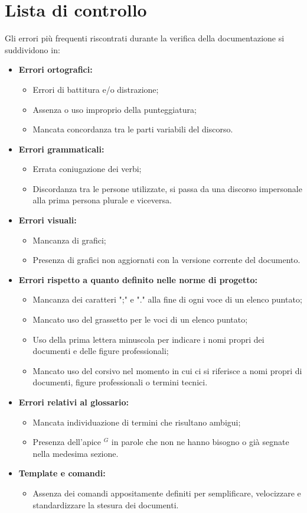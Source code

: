\clearpage
\section{Lista di controllo}
\label{lista_controllo}
Gli errori più frequenti riscontrati durante la verifica della documentazione si suddividono in:
\begin{itemize}
	\item \textbf{Errori ortografici:}
	\begin{itemize}
		\item Errori di battitura e/o distrazione;
		\item Assenza o uso improprio della punteggiatura;
		\item Mancata concordanza tra le parti variabili del discorso.
	\end{itemize}
	\item \textbf{Errori grammaticali:}
	\begin{itemize}
		\item Errata coniugazione dei verbi;
		\item Discordanza tra le persone utilizzate, si passa da una discorso impersonale alla prima persona plurale e viceversa.
	\end{itemize}
	\item \textbf{Errori visuali:}
	\begin{itemize}
		\item Mancanza di grafici;
		\item Presenza di grafici non aggiornati con la versione corrente del documento.
	\end{itemize}
	\item \textbf{Errori rispetto a quanto definito nelle norme di progetto:}
	\begin{itemize}
		\item Mancanza dei caratteri ";" e "." alla fine di ogni voce di un elenco puntato;
		\item Mancato uso del grassetto per le voci di un elenco puntato;
		\item Uso della prima lettera minuscola per indicare i nomi propri dei documenti e delle figure professionali;
		\item Mancato uso del corsivo nel momento in cui ci si riferisce a nomi propri di documenti, figure professionali o termini tecnici.
	\end{itemize}
	\item \textbf{Errori relativi al glossario:}
	\begin{itemize}
		\item Mancata individuazione di termini che risultano ambigui;
		\item Presenza dell'apice $^G$ in parole che non ne hanno bisogno o già segnate nella medesima sezione.
	\end{itemize}
	\item \textbf{Template e comandi:}
	\begin{itemize}
		\item Assenza dei comandi appositamente definiti per semplificare, velocizzare e standardizzare la stesura dei documenti.
	\end{itemize}
\end{itemize}